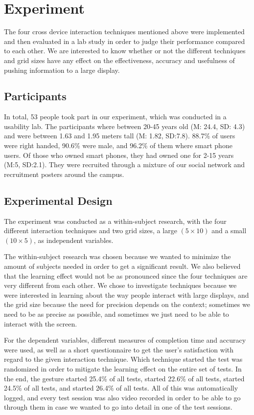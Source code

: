 \section{Experiment} \label{sec:experiment}
The four cross device interaction techniques mentioned above were implemented and then evaluated in a lab study in order to judge their performance compared to each other. We are interested to know whether or not the different techniques and grid sizes have any effect on the effectiveness, accuracy and usefulness of pushing information to a large display. 

\subsection{Participants}
In total, 53 people took part in our experiment, which was conducted in a usability lab. 
The participants where between 20-45 years old (M: 24.4, SD: 4.3) and were between 1.63 and 1.95 meters tall (M: 1.82, SD:7.8). 
88.7\% of users were right handed, 90.6\% were male, and 96.2\% of them where smart phone users. 
Of those who owned smart phones, they had owned one for 2-15 years (M:5, SD:2.1). 
They were recruited through a mixture of our social network and recruitment posters around the campus. 

\subsection{Experimental Design}\label{sec:expdesign}
The experiment was conducted as a within-subject research, with the four different interaction techniques and two grid sizes, a large $(5 \times 10)$ and a small $(10 \times 5)$, as independent variables. 

The within-subject research was chosen because we wanted to minimize the amount of subjects needed in order to get a significant result. We also believed that the learning effect would not be as pronounced since the four techniques are very different from each other. 
We chose to investigate techniques because we were interested in learning about the way people interact with large displays, and the grid size because the need for precision depends on the context; sometimes we need to be as precise as possible, and sometimes we just need to be able to interact with the screen. 

For the dependent variables, different measures of completion time and accuracy were used, as well as a short questionnaire to get the user's satisfaction with regard to the given interaction technique. 
Which technique started the test was randomized in order to mitigate the learning effect on the entire set of tests. 
In the end, the \pinch gesture started 25.4\% of all tests, \swipe started 22.6\% of all tests, \throw started 24.5\% of all tests, and \tilt started 26.4\% of all tests. 
All of this was automatically logged, and every test session was also video recorded in order to be able to go through them in case we wanted to go into detail in one of the test sessions.

